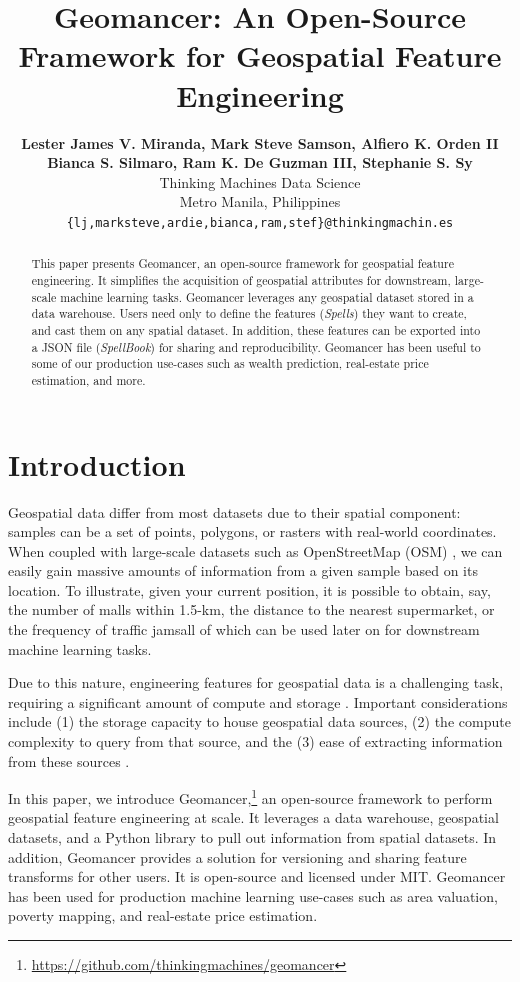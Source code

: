 \documentclass{article}
\title{Geomancer: An Open-Source Framework for Geospatial Feature Engineering}
\author{%
  \textbf{Lester James V. Miranda, Mark Steve Samson, Alfiero K. Orden II}\\
  \textbf{Bianca S. Silmaro, Ram K. De Guzman III, Stephanie S. Sy}\\
  Thinking Machines Data Science\\
  Metro Manila, Philippines\\
  \texttt{\{lj,marksteve,ardie,bianca,ram,stef\}@thinkingmachin.es} \\
}
\begin{document}
\maketitle

\begin{abstract}
    This paper presents Geomancer, an open-source framework for geospatial
    feature engineering. It simplifies the acquisition of geospatial attributes
    for downstream, large-scale machine learning tasks.  Geomancer leverages
    any geospatial dataset stored in a data warehouse. Users need only to
    define the features (\textit{Spells}) they want to create, and cast them on
    any spatial dataset. In addition, these features can be exported into a
    JSON file (\textit{SpellBook}) for sharing and reproducibility.  Geomancer
    has been useful to some of our production use-cases such as wealth
    prediction, real-estate price estimation, and more.
\end{abstract}

\section{Introduction}

Geospatial data differ from most datasets due to their spatial component:
samples can be a set of points, polygons, or rasters with real-world
coordinates. When coupled with large-scale datasets such as OpenStreetMap (OSM)
\cite{osm2017}, we can easily gain massive amounts of information from a given
sample based on its location. To illustrate, given your current position, it is
possible to obtain, say, the number of malls within 1.5-km, the distance to the
nearest supermarket, or the frequency of traffic jams\textemdash all of which
can be used later on for downstream machine learning tasks. 

Due to this nature, engineering features for geospatial data is a challenging
task, requiring a significant amount of compute and storage
\cite{nargesian2017learning, nargesian2018dataset, storcheus2015survey}.
Important considerations include (1) the storage capacity to house
geospatial data sources, (2) the compute complexity to query from that source,
and the (3) ease of extracting information from these sources
\cite{klien2005requirements}. 

In this paper, we introduce
Geomancer,\footnote{\url{https://github.com/thinkingmachines/geomancer}} an
open-source framework to perform geospatial feature engineering at scale. It
leverages a data warehouse, geospatial datasets, and a Python library to pull
out information from spatial datasets. In addition, Geomancer provides a
solution for versioning and sharing feature transforms for other users. It is
open-source and licensed under MIT. Geomancer has been used for production
machine learning use-cases such as area valuation, poverty mapping, and
real-estate price estimation.
\end{document}
